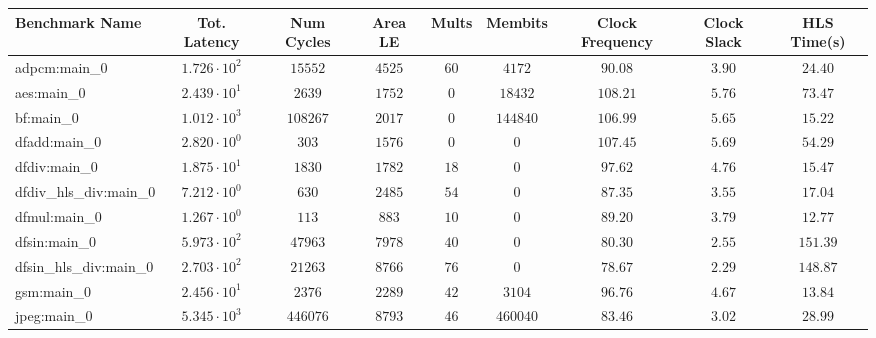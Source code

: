 \begin{tabular}{|l|c|c|c|c|c|c|c|c|}
\hline
Benchmark Name          & Tot. Latency           & Num Cycles & Area LE   & Mults   & Membits    & Clock Frequency & Clock Slack & HLS Time(s) \\
\hline
adpcm:main\_0           & $ 1.726 \cdot 10^{2} $ & $ 15552  $ & $ 4525  $ & $ 60  $ & $ 4172   $ & $ 90.08       $ & $ 3.90    $ & $ 24.40   $ \\
aes:main\_0             & $ 2.439 \cdot 10^{1} $ & $ 2639   $ & $ 1752  $ & $ 0   $ & $ 18432  $ & $ 108.21      $ & $ 5.76    $ & $ 73.47   $ \\
bf:main\_0              & $ 1.012 \cdot 10^{3} $ & $ 108267 $ & $ 2017  $ & $ 0   $ & $ 144840 $ & $ 106.99      $ & $ 5.65    $ & $ 15.22   $ \\
dfadd:main\_0           & $ 2.820 \cdot 10^{0} $ & $ 303    $ & $ 1576  $ & $ 0   $ & $ 0      $ & $ 107.45      $ & $ 5.69    $ & $ 54.29   $ \\
dfdiv:main\_0           & $ 1.875 \cdot 10^{1} $ & $ 1830   $ & $ 1782  $ & $ 18  $ & $ 0      $ & $ 97.62       $ & $ 4.76    $ & $ 15.47   $ \\
dfdiv\_hls\_div:main\_0 & $ 7.212 \cdot 10^{0} $ & $ 630    $ & $ 2485  $ & $ 54  $ & $ 0      $ & $ 87.35       $ & $ 3.55    $ & $ 17.04   $ \\
dfmul:main\_0           & $ 1.267 \cdot 10^{0} $ & $ 113    $ & $ 883   $ & $ 10  $ & $ 0      $ & $ 89.20       $ & $ 3.79    $ & $ 12.77   $ \\
dfsin:main\_0           & $ 5.973 \cdot 10^{2} $ & $ 47963  $ & $ 7978  $ & $ 40  $ & $ 0      $ & $ 80.30       $ & $ 2.55    $ & $ 151.39  $ \\
dfsin\_hls\_div:main\_0 & $ 2.703 \cdot 10^{2} $ & $ 21263  $ & $ 8766  $ & $ 76  $ & $ 0      $ & $ 78.67       $ & $ 2.29    $ & $ 148.87  $ \\
gsm:main\_0             & $ 2.456 \cdot 10^{1} $ & $ 2376   $ & $ 2289  $ & $ 42  $ & $ 3104   $ & $ 96.76       $ & $ 4.67    $ & $ 13.84   $ \\
jpeg:main\_0            & $ 5.345 \cdot 10^{3} $ & $ 446076 $ & $ 8793  $ & $ 46  $ & $ 460040 $ & $ 83.46       $ & $ 3.02    $ & $ 28.99   $ \\

\end{tabular}
